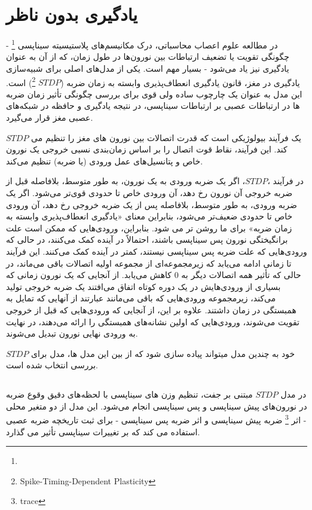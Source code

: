 
\section{یادگیری بدون ناظر}
    در مطالعه علوم اعصاب محاسباتی، درک مکانیسم‌های پلاستیسیته سیناپسی
    \footnote{}
    - چگونگی تقویت یا تضعیف ارتباطات بین نورون‌ها در طول زمان، که از آن به عنوان یادگیری نیز یاد می‌شود - بسیار مهم است. یکی از مدل‌های اصلی برای شبیه‌سازی یادگیری در مغز، قانون یادگیری انعطاف‌پذیری وابسته به زمان ضربه 
    ($STDP$ \footnote{Spike-Timing-Dependent Plasticity})
    است. این مدل به عنوان یک چارچوب ساده ولی قوی برای بررسی چگونگی تأثیر زمان ضربه ها در ارتباطات عصبی بر ارتباطات سیناپسی، در نتیجه یادگیری و حافظه در شبکه‌های عصبی مغز قرار می‌گیرد.

    $STDP$
    یک فرآیند بیولوژیکی است که قدرت اتصالات بین نورون های مغز را تنظیم می کند. این فرآیند، نقاط قوت اتصال را بر اساس زمان‌بندی نسبی خروجی یک نورون خاص و پتانسیل‌های عمل ورودی 
    (یا ضربه)
    تنظیم می‌کند.

    در فرآیند 
    $STDP،$، 
    اگر یک ضربه ورودی به یک نورون، به طور متوسط، بلافاصله قبل از ضربه خروجی آن نورون رخ دهد، آن ورودی خاص تا حدودی قوی‌تر می‌شود. اگر یک ضربه ورودی، به طور متوسط، بلافاصله پس از یک ضربه خروجی رخ دهد، آن ورودی خاص تا حدودی ضعیف‌تر می‌شود، بنابراین معنای «یادگیری انعطاف‌پذیری وابسته به زمان ضربه» برای ما روشن تر می شود. بنابراین، ورودی‌هایی که ممکن است علت برانگیختگی نورون پس سیناپسی باشند، احتمالاً در آینده کمک می‌کنند، در حالی که ورودی‌هایی که علت ضربه پس سیناپسی نیستند، کمتر در آینده کمک می‌کنند. این فرآیند تا زمانی ادامه می‌یابد که زیرمجموعه‌ای از مجموعه اولیه اتصالات باقی می‌ماند، در حالی که تأثیر همه اتصالات دیگر به 0 کاهش می‌یابد.
    \cite{STDP-Wikipedia}
    از آنجایی که یک نورون زمانی که بسیاری از ورودی‌هایش در یک دوره کوتاه اتفاق می‌افتند یک ضربه خروجی تولید می‌کند، زیرمجموعه ورودی‌هایی که باقی می‌مانند عبارتند از آنهایی که تمایل به همبستگی در زمان داشتند. علاوه بر این، از آنجایی که ورودی‌هایی که قبل از خروجی تقویت می‌شوند، ورودی‌هایی که اولین نشانه‌های همبستگی را ارائه می‌دهند، در نهایت به ورودی نهایی نورون تبدیل می‌شوند.

    $STDP$ 
    خود به چندین مدل میتواند پیاده سازی شود که از بین این مدل ها، مدل 
    برای بررسی انتخاب شده است.

    \subsection{}
        در مدل 
        $STDP$ 
        مبتنی بر جفت، تنظیم وزن های سیناپسی با لحظه‌های دقیق وقوع ضربه در نورون‌های پیش سیناپسی و پس سیناپسی انجام می‌شود. این مدل از دو متغیر محلی - اثر
        \footnote{trace}
        ضربه پیش سیناپسی و اثر ضربه پس سیناپسی - برای ثبت تاریخچه ضربه عصبی استفاده می کند که بر تغییرات سیناپسی تأثیر می گذارد.

